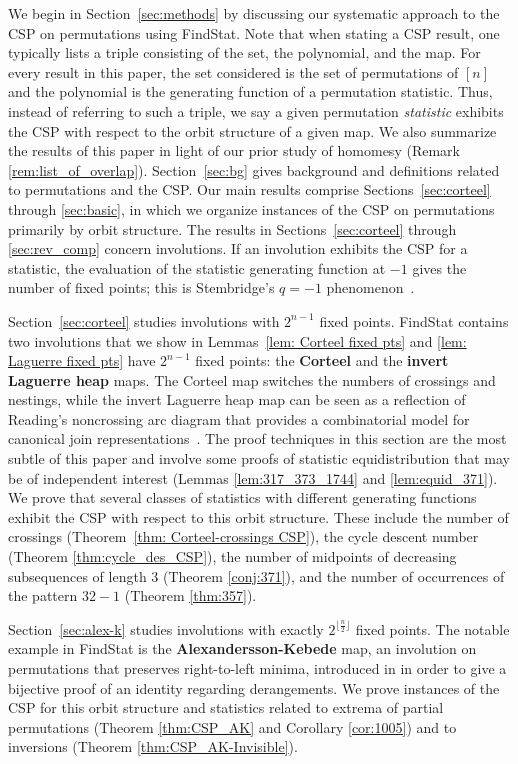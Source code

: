 \documentclass{amsart}
\theoremstyle{definition}
\begin{document}
We begin in Section~\ref{sec:methods} by discussing our systematic approach to the CSP on permutations using FindStat. Note that when stating a CSP result, one typically lists a triple consisting of the set, the polynomial, and the map. For every result in this paper, the set considered is the set of permutations of $[n]$ and the polynomial is the generating function of a permutation statistic. Thus, instead of referring to such a triple, we say a given permutation \emph{statistic} exhibits the CSP with respect to the orbit structure of a given map.
We also summarize the results of this paper in light of our prior study of homomesy \cite{ELMSW22} (Remark \ref{rem:list_of_overlap}).   Section~\ref{sec:bg} gives background and definitions related to permutations and the CSP. 
Our main results comprise Sections~\ref{sec:corteel} through \ref{sec:basic}, in which we
organize instances of the CSP on permutations primarily by orbit structure.
The results in Sections~\ref{sec:corteel} through \ref{sec:rev_comp}  concern involutions. If an involution exhibits the CSP for a statistic, the evaluation of the statistic generating function at $-1$ gives the number of fixed points; this is Stembridge's $q=-1$ phenomenon~\cite{JStembridge,Stembridge1994}. 

Section~\ref{sec:corteel} studies involutions with $2^{n-1}$ fixed points. FindStat contains two involutions that we show in Lemmas~\ref{lem: Corteel fixed pts} and \ref{lem: Laguerre fixed pts} have $2^{n-1}$ fixed points: the \textbf{Corteel} and the \textbf{invert Laguerre heap} maps. The Corteel map switches the numbers of crossings and nestings, while the invert Laguerre heap map can be seen as a  reflection of Reading's noncrossing arc diagram that provides a combinatorial model for canonical join representations~\cite{reading2015noncrossing}. 
The proof techniques in this section are the most subtle of this paper
and involve some proofs of statistic equidistribution that may be of independent interest (Lemmas \ref{lem:317_373_1744} and \ref{lem:equid_371}). We prove that several classes of statistics with different generating functions exhibit the CSP with respect to this orbit structure. These include the number of crossings (Theorem~\ref{thm: Corteel-crossings CSP}), the cycle descent number (Theorem \ref{thm:cycle_des_CSP}), 
the number of midpoints of decreasing subsequences of length 3 (Theorem \ref{conj:371}), and the number of occurrences of the pattern $32-1$ (Theorem  \ref{thm:357}).

Section~\ref{sec:alex-k} studies involutions with exactly  $2^{\lfloor \frac{n}{2}\rfloor}$ fixed points. The notable example in FindStat is the \textbf{Alexandersson-Kebede} map, an involution on permutations that preserves right-to-left minima,  introduced in \cite{AlexanderssonKebede} in order to give a bijective proof of an identity regarding derangements. We prove instances of the CSP for this orbit structure and statistics related to extrema of partial permutations (Theorem \ref{thm:CSP_AK} and Corollary \ref{cor:1005}) and to  inversions (Theorem \ref{thm:CSP_AK-Invisible}).
\end{document}
